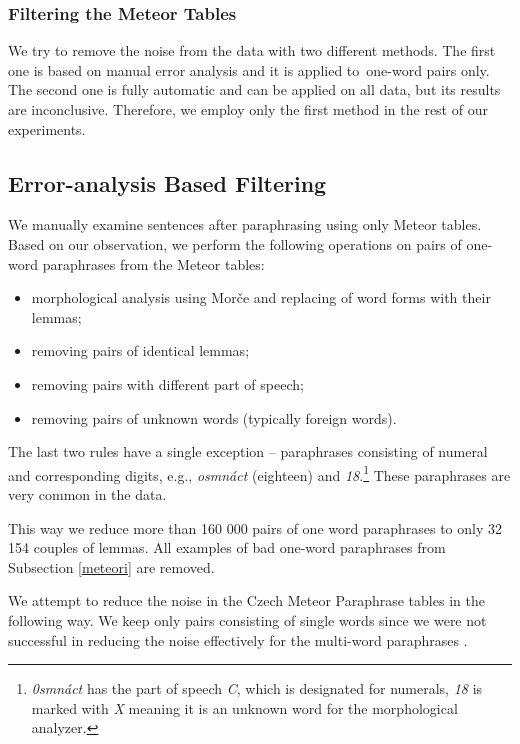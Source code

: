 \documentclass[11pt]{article}
\begin{document}
\subsubsection{Filtering the Meteor Tables}
\label{filtering-section}
We try to remove the noise from the data with two different methods. The first
one is based on manual error analysis and it is applied to~one-word pairs only.
The second one is fully automatic and can be applied on all data, but its results 
are inconclusive. Therefore, we employ only the first method in the rest of our 
experiments.

\subsection{Error-analysis Based Filtering}
We manually examine sentences after paraphrasing using only Meteor tables. Based on
our observation, we perform the following operations on pairs of one-word paraphrases 
from the Meteor tables:

\begin{itemize}
\item morphological analysis using Morče \cite{morce:2007} and replacing of word forms with their lemmas; 
\item removing pairs of identical lemmas;
\item removing pairs with different part of speech;
\item removing pairs of unknown words (typically foreign words).
\end{itemize}

The last two rules have a single exception -- paraphrases consisting of numeral and 
corresponding digits, e.g., \textit{osmnáct} (eighteen) and \textit{18}.\footnote{
\textit{0smnáct} has the part of speech \textit{C}, which is designated for numerals, 
\textit{18} is marked with \textit{X} meaning it is an unknown word for the morphological
analyzer.} These paraphrases are very common in the data. 

This way we reduce more than 160 000 pairs of one word paraphrases to only 32 154
couples of lemmas. All examples of bad one-word paraphrases from Subsection \ref{meteori} 
are removed.



We attempt to reduce the noise in the Czech Meteor Paraphrase tables in the following way. We 
keep only pairs consisting of single words since we were not successful in reducing the noise
effectively for the multi-word paraphrases \cite{barancikova2014}. 
\end{document}
